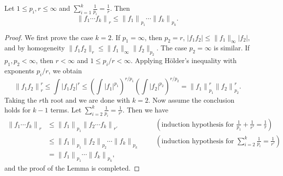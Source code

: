 \begin{lemma}
  Let $1 \le p_i, r \le \infty$ and
  $\sum_{i=1}^k \frac{1}{p_i} = \frac{1}{r}$.
  Then
  \[
    \left\| f_1 \cdots f_k \right\|_r \le
    \left\| f_1 \right\|_{p_1} \cdots \left\| f_k \right\|_{p_k}.
  \]
\end{lemma}
\begin{proof}
  We first prove the case $k=2$.
  If $p_1 = \infty$, then $p_2 = r$,
  $|f_1 f_2| \le \|f_1\|_{\infty} |f_2|$,
  and by homogeneity $\|f_1 f_2\|_r \le \|f_1\|_{\infty} \|f_2\|_{p_2}$.
  The case $p_2 = \infty$ is similar.
  If $p_1, p_2 < \infty$, then $r < \infty$ and $1 \le p_i/r < \infty$.
  Applying H\"{o}lder's inequality with exponents $p_i/r$,
  we obtain
  \[
    \left\| f_1 f_2 \right\|_r^r
    \le \int \left| f_1 f_2 \right|^r
    \le \left( \int \left| f_1 \right|^{p_1} \right)^{r/p_1}
    \left( \int \left| f_2 \right|^{p_2} \right)^{r/p_2}
    = \left\| f_1 \right\|_{p_1}^r \left\| f_2 \right\|_{p_2}^r.
  \]
  Taking the $r$th root and we are done with $k=2$.
  Now assume the conclusion holds for $k-1$ terms.
  Let $\sum_{i=2}^{k} \frac{1}{p_i} = \frac{1}{r'}$.
  Then we have
  \[
    \begin{aligned}
      \left\| f_1 \cdots f_k \right\|_r
      &\le \left\| f_1 \right\|_{p_1} \left\| f_2 \cdots f_k \right\|_{r'}
      \quad &&(\text{induction hypothesis for }
      \frac{1}{p_1} + \frac{1}{r'} = \frac{1}{r}) \\
      &\le \left\| f_1 \right\|_{p_1}
      \left\| f_2 \right\|_{p_2} \cdots \left\| f_k \right\|_{p_k}
      \quad &&(\text{induction hypothesis for }
      \sum_{i=2}^{k} \frac{1}{p_i} = \frac{1}{r'}) \\
      &= \left\| f_1 \right\|_{p_1} \cdots \left\| f_k \right\|_{p_k},
    \end{aligned}
  \]
  and the proof of the Lemma is completed.
\end{proof}

